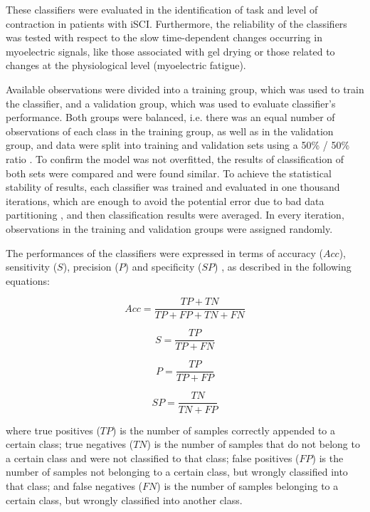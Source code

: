 These classifiers were evaluated in the identification of task and level of contraction in patients with iSCI. Furthermore, the reliability of the classifiers was tested with respect to the slow time-dependent changes occurring in myoelectric signals, like those associated with gel drying or those related to changes at the physiological level (myoelectric fatigue).

Available observations were divided into a training group, which was used to train the classifier, and a validation group, which was used to evaluate classifier’s performance. Both groups were balanced, i.e. there was an equal number of observations of each class in the training group, as well as in the validation group, and data were split into training and validation sets using a 50\% / 50\% ratio \citep{Wang2015}. To confirm the model was not overfitted, the results of classification of both sets were compared and were found similar. To achieve the statistical stability of results, each classifier was trained and evaluated in one thousand iterations, which are enough to avoid the potential error due to bad data partitioning \citep{Zimmer2016}, and then classification results were averaged. In every iteration, observations in the training and validation groups were assigned randomly.

The performances of the classifiers were expressed in terms of accuracy ($Acc$), sensitivity ($S$), precision ($P$) and specificity ($SP$) \citep{Farina2001}, as described in the following equations:

\begin{equation} \label{eq:1-5}
Acc = \frac{TP + TN}{TP + FP + TN + FN}
\end{equation}

\begin{equation} \label{eq:1-6}
S = \frac{TP}{TP + FN}
\end{equation}

\begin{equation} \label{eq:1-7}
P = \frac{TP}{TP + FP}
\end{equation}

\begin{equation} \label{eq:1-8}
SP = \frac{TN}{TN + FP}
\end{equation}

where true positives ($TP$) is the number of samples correctly appended to a certain class; true negatives ($TN$) is the number of samples that do not belong to a certain class and were not classified to that class; false positives ($FP$) is the number of samples not belonging to a certain class, but wrongly classified into that class; and false negatives ($FN$) is the number of samples belonging to a certain class, but wrongly classified into another class.


